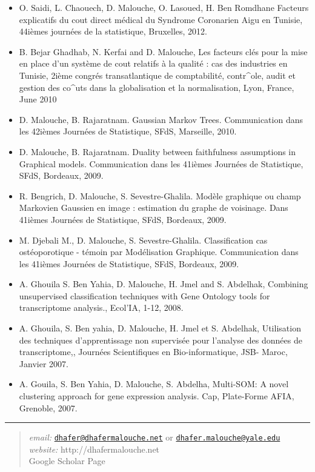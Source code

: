 \documentclass[]{article}
\begin{document}
\begin{itemize}
\item
  O. Saidi, L. Chaouech, D. Malouche, O. Lasoued, H. Ben Romdhane
  Facteurs explicatifs du cout direct médical du Syndrome Coronarien
  Aigu en Tunisie, 44ièmes journées de la statistique, Bruxelles, 2012.
\item
  B. Bejar Ghadhab, N. Kerfai and D. Malouche, Les facteurs clés pour la
  mise en place d'un système de cout relatifs à la qualité : cas des
  industries en Tunisie, 2ième congrés transatlantique de comptabilité,
  contr\^{}ole, audit et gestion des co\^{}uts dans la globalisation et
  la normalisation, Lyon, France, June 2010
\item
  D. Malouche, B. Rajaratnam. Gaussian Markov Trees. Communication dans
  les 42ièmes Journées de Statistique, SFdS, Marseille, 2010.
\item
  D. Malouche, B. Rajaratnam. Duality between faithfulness assumptions
  in Graphical models. Communication dans les 41ièmes Journées de
  Statistique, SFdS, Bordeaux, 2009.
\item
  R. Bengrich, D. Malouche, S. Sevestre-Ghalila. Modèle graphique ou
  champ Markovien Gaussien en image : estimation du graphe de voisinage.
  Dans 41ièmes Journées de Statistique, SFdS, Bordeaux, 2009.
\item
  M. Djebali M., D. Malouche, S. Sevestre-Ghalila. Classification cas
  ostéoporotique - témoin par Modélisation Graphique. Communication dans
  les 41ièmes Journées de Statistique, SFdS, Bordeaux, 2009.
\item
  A. Ghouila S. Ben Yahia, D. Malouche, H. Jmel and S. Abdelhak,
  Combining unsupervised classification techniques with Gene Ontology
  tools for transcriptome analysis., Ecol'IA, 1-12, 2008.
\item
  A. Ghouila, S. Ben yahia, D. Malouche, H. Jmel et S. Abdelhak,
  Utilisation des techniques d'apprentissage non supervisée pour
  l'analyse des données de transcriptome,, Journées Scientifiques en
  Bio-informatique, JSB- Maroc, Janvier 2007.
\item
  A. Gouila, S. Ben Yahia, D. Malouche, S. Abdelha, Multi-SOM: A novel
  clustering approach for gene expression analysis. Cap, Plate-Forme
  AFIA, Grenoble, 2007.
\end{itemize}

\begin{center}\rule{0.5\linewidth}{\linethickness}\end{center}

\begin{quote}
\emph{email:}
\href{mailto:dhafer@dhafermalouche.net}{\nolinkurl{dhafer@dhafermalouche.net}}
or
\href{mailto:dhafer.malouche@yale.edu}{\nolinkurl{dhafer.malouche@yale.edu}}\\
\emph{website:} http://dhafermalouche.net\\
Google Scholar Page
\end{quote}
\end{document}
